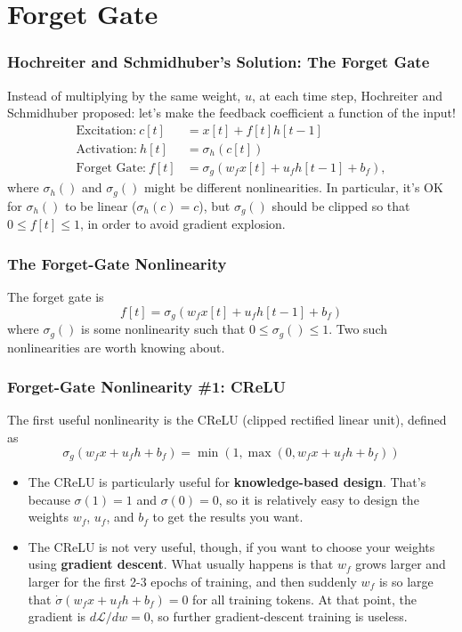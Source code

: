 \documentclass{beamer}
\begin{document}
\section[Forget Gate]{Forget Gate}
\setcounter{subsection}{1}

\begin{frame}
  \frametitle{Hochreiter and Schmidhuber's Solution: The Forget Gate}

  Instead of multiplying by the same weight, $u$, at each time step,
  Hochreiter and Schmidhuber proposed: let's make the feedback
  coefficient a function of the input!
  \begin{align*}
    \mbox{Excitation:}~c[t] &= x[t]+f[t]h[t-1]\\
    \mbox{Activation:}~h[t] &= \sigma_h\left(c[t]\right)\\
    \mbox{Forget Gate:}~f[t] &= \sigma_g\left(w_fx[t]+u_fh[t-1]+b_f\right),
  \end{align*}
  where $\sigma_h()$ and $\sigma_g()$ might be different
  nonlinearities.  In particular, it's OK for $\sigma_h()$ to be
  linear ($\sigma_h(c)=c$), but $\sigma_g()$ should be clipped so that
  $0\le f[t]\le 1$, in order to avoid gradient explosion.
\end{frame}

\begin{frame}
  \frametitle{The Forget-Gate Nonlinearity}
  The forget gate is
  \[
  f[t] = \sigma_g\left(w_fx[t]+u_fh[t-1]+b_f\right)
  \]
  where $\sigma_g()$ is some nonlinearity such that $0\le \sigma_g() \le
  1$.  Two such nonlinearities are worth knowing about.
\end{frame}
\begin{frame}
  \frametitle{Forget-Gate Nonlinearity \#1: CReLU}

  The first useful nonlinearity is the CReLU (clipped rectified linear
  unit), defined as
  \[
  \sigma_g(w_fx+u_fh+b_f) = \min\left(1,\max\left(0,w_fx+u_fh+b_f\right)\right)
  \]
  \begin{itemize}
    \item The CReLU is particularly useful for {\bf knowledge-based
      design}.  That's because $\sigma(1)=1$ and $\sigma(0)=0$, so it
      is relatively easy to design the weights $w_f$, $u_f$, and $b_f$
      to get the results you want.
    \item The CReLU is not very useful, though, if you want to choose
      your weights using {\bf gradient descent}.  What usually happens
      is that $w_f$ grows larger and larger for the first 2-3 epochs
      of training, and then suddenly $w_f$ is so large that
      $\dot\sigma(w_fx+u_fh+b_f)=0$ for all training tokens.  At that
      point, the gradient is $d{\mathcal L}/dw=0$, so further gradient-descent
      training is useless.
  \end{itemize}
\end{frame}
\end{document}
